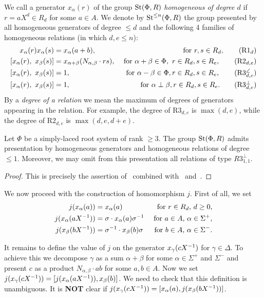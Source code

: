 We call a generator $x_\alpha(r)$ of the group $\operatorname{St}(\Phi, R)$ \textit{homogeneous of degree $d$} if $r = aX^d \in R_d$ for some $a\in A$.
We denote by $\operatorname{St}^{\leq n}(\Phi, R)$ the group presented by all homogeneous generators of degree $\leq d$ and the following 4 families of homogeneous relations (in which $d, e \leq n$):
\begin{align}
    x_{\alpha}(r) x_{\alpha}(s)    &= x_{\alpha}(a + b), & \text{ for } r, s \in R_d, \tag{R$1_d$} \\
    [x_{\alpha}(r),\ x_{\beta}(s)] &= x_{\alpha + \beta}(N_{\alpha, \beta} \cdot rs), &\text{ for } \alpha + \beta \in \Phi,\ r \in R_d, s \in R_e, \tag{R$2_{d, e}$} \\
    [x_{\alpha}(r),\ x_{\beta}(s)] &= 1, &\text{ for }\alpha - \beta \in \Phi, r \in R_d, s \in R_e, \tag{R$3_{d, e}^\angle$} \\
    [x_{\alpha}(r),\ x_{\beta}(s)] &= 1, &\text{ for }\alpha \perp \beta, r \in R_d, s \in R_e. \tag{R$3_{d,e}^\perp$}
\end{align}
By a \textit{degree of a relation} we mean the maximum of degrees of generators appearing in the relation.
For example, the degree of R$3_{d, e}$ is $\max(d, e)$, while the degree of R$2_{d, e}$ is $\max(d, e, d+e).$

\begin{lemma} \label{lem:homog-presentation}
    Let $\Phi$ be a simply-laced root system of rank $\geq 3$. %
    The group $\operatorname{St}(\Phi, R)$ admits presentation by homogeneous generators and homogeneous relations of degree $\leq 1$.
    Moreover, we may omit from this presentation all relations of type $R3^\perp_{1, 1}$.
\end{lemma}
\begin{proof}
    This is precisely the assertion of~\cite[Proposition~5.3]{LS20} combined with~\cite[Lemma~5.2]{LS20} and~\cite[Remark~5.5]{LS20}.
\end{proof}

We now proceed with the construction of homomorphism $j$.
First of all, we set
\begin{align}
    j(x_\alpha(a))       & = x_\alpha(a) & \text{ for } r \in R_d,\, d \geq 0, \\
    j(x_\alpha(a X^{-1})) & = \sigma \cdot x_\alpha(a) \sigma^{-1} & \text{ for } a \in A,\, \alpha \in \Sigma^+, \\
    j(x_\beta(bX ^{-1}))  & = \sigma^{-1} \cdot x_\beta(b) \sigma & \text{ for } b \in A,\, \alpha \in \Sigma^-.
\end{align}

It remains to define the value of $j$ on the generator $x_\gamma(cX^{-1})$ for $\gamma \in \Delta$.
To achieve this we decompose $\gamma$ as a sum $\alpha + \beta$ for some $\alpha \in \Sigma^+$ and $\Sigma^-$
 and present $c$ as a product $N_{\alpha, \beta} \cdot a b$ for some $a, b \in A$. %
Now we set $j(x_\gamma(c X^{-1})) = [j(x_\alpha(a X^{-1})), x_\beta(b)]$.
We need to check that this definition is unambiguous.
It is \textbf{NOT} clear if $j(x_\gamma(c X^{-1})) = [x_\alpha(a), j(x_\beta(bX^{-1}))]$.

